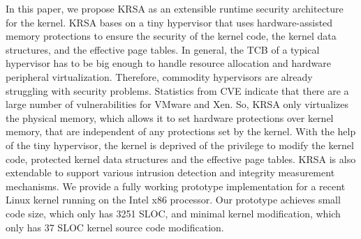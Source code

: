 \documentclass[conference]{IEEEtran}
\begin{document}

In this paper, we propose KRSA as an extensible runtime security architecture for the kernel. KRSA bases on a tiny hypervisor that uses hardware-assisted memory protections to ensure the security of the kernel code, the kernel data structures, and the effective page tables. 
In general, the TCB of a typical hypervisor has to be big enough to handle resource allocation and hardware peripheral virtualization. Therefore, commodity hypervisors are already struggling with security problems. Statistics from CVE indicate that there are a large number of vulnerabilities for VMware \cite{vmwarecve} and Xen\cite{xencve}. So, KRSA only virtualizes the physical memory, which allows it to set hardware protections over kernel memory, that are independent of any protections set by the kernel.  
With the help of the tiny hypervisor, the kernel is deprived of the privilege to modify the kernel code, protected kernel data structures and the effective page tables.
KRSA is also extendable to support various intrusion detection and integrity measurement mechanisms. %
We provide a fully working prototype implementation for a recent Linux kernel running on the Intel x86 processor. Our prototype achieves small code size, which only has 3251 SLOC, and minimal kernel modification, which only has 37 SLOC kernel source code modification.
\end{document}
